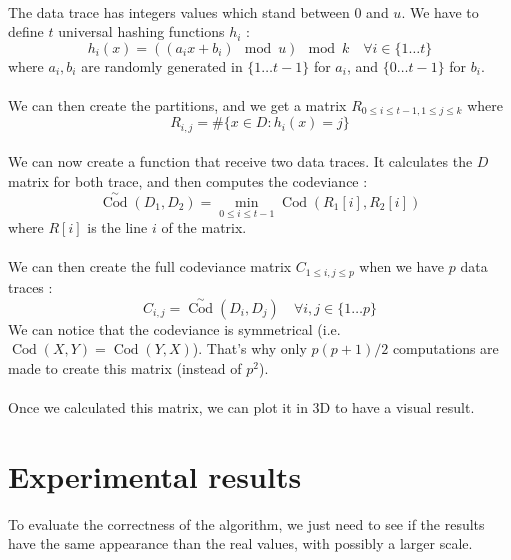\documentclass[a4paper]{article}%
\DeclareMathOperator{\Cod}{Cod}
\newcommand{\CodSk}{\overset{\sim}{\Cod}}
\begin{document}
\paragraph{}The data trace has integers values which stand between $0$ and $u$. We have to define $t$ universal hashing functions $h_i$ :
	\[ h_i(x) = ((a_ix+b_i) \mod u) \mod k \quad \forall i \in \lbrace 1 \ldots t \rbrace \]
where $a_i, b_i$ are randomly generated in $\lbrace 1 \dots t-1 \rbrace$ for $a_i$, and $\lbrace 0 \ldots t-1 \rbrace$ for $b_i$.

\paragraph{}We can then create the partitions, and we get a matrix $R_{0 \leq i \leq t-1, 1 \leq j \leq k}$ where 
 	\[ R_{i,j} = \# \lbrace x \in D : h_i(x) = j \rbrace \]
 	
\paragraph{}We can now create a function that receive two data traces. It calculates the $D$ matrix for both trace, and then computes the codeviance :
	\[ \CodSk(D_1, D_2) = \underset{0 \leq i \leq t-1}{\min} \Cod(R_1[i], R_2[i]) \]
where $R[i]$ is the line $i$ of the matrix.

\paragraph{}We can then create the full codeviance matrix $C_{1 \leq i,j \leq p}$ when we have $p$ data traces :
	\[ C_{i,j} = \CodSk(D_i, D_j) \quad \forall i,j \in \lbrace 1 \ldots p \rbrace \]
We can notice that the codeviance is symmetrical (i.e. $\Cod(X,Y) = \Cod(Y,X)$). That's why only $p(p+1)/2$ computations are made to create this matrix (instead of $p^2$).

\paragraph{}Once we calculated this matrix, we can plot it in 3D to have a visual result.



\section{Experimental results}
To evaluate the correctness of the algorithm, we just need to see if the results have the same appearance than the real values, with possibly a larger scale.
\end{document}
